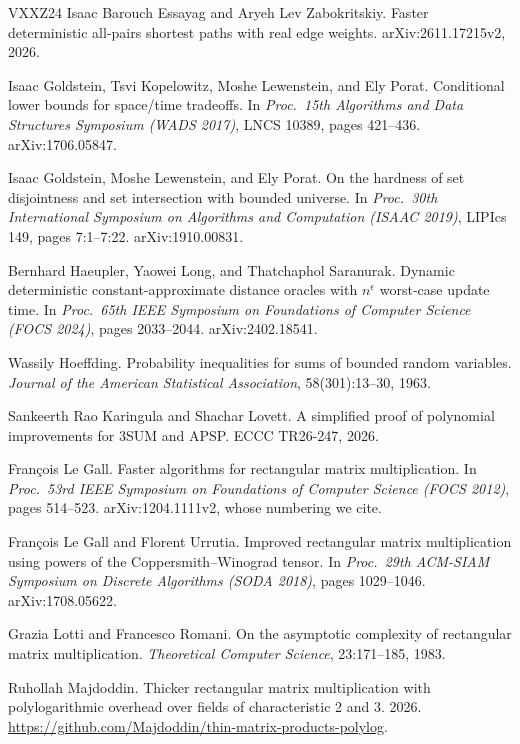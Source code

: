 \documentclass[11pt]{article}
\theoremstyle{definition}
\theoremstyle{remark}
\begin{document}
\begin{thebibliography}{VXXZ24}
 Isaac Barouch Essayag and Aryeh Lev Zabokritskiy. Faster deterministic all-pairs shortest paths with real edge weights. arXiv:2611.17215v2, 2026.

 Isaac Goldstein, Tsvi Kopelowitz, Moshe Lewenstein, and Ely Porat. Conditional lower bounds for space/time tradeoffs. In \emph{Proc.\ 15th Algorithms and Data Structures Symposium (WADS 2017)}, LNCS 10389, pages 421--436. arXiv:1706.05847.

 Isaac Goldstein, Moshe Lewenstein, and Ely Porat. On the hardness of set disjointness and set intersection with bounded universe. In \emph{Proc.\ 30th International Symposium on Algorithms and Computation (ISAAC 2019)}, LIPIcs 149, pages 7:1--7:22. arXiv:1910.00831.

 Bernhard Haeupler, Yaowei Long, and Thatchaphol Saranurak. Dynamic deterministic constant-approximate distance oracles with $n^{\epsilon}$ worst-case update time. In \emph{Proc.\ 65th IEEE Symposium on Foundations of Computer Science (FOCS 2024)}, pages 2033--2044. arXiv:2402.18541.

 Wassily Hoeffding. Probability inequalities for sums of bounded random variables. \emph{Journal of the American Statistical Association}, 58(301):13--30, 1963.

 Sankeerth Rao Karingula and Shachar Lovett. A simplified proof of polynomial improvements for 3SUM and APSP. ECCC TR26-247, 2026.

 Fran\c{c}ois Le Gall. Faster algorithms for rectangular matrix multiplication. In \emph{Proc.\ 53rd IEEE Symposium on Foundations of Computer Science (FOCS 2012)}, pages 514--523. arXiv:1204.1111v2, whose numbering we cite.

 Fran\c{c}ois Le Gall and Florent Urrutia. Improved rectangular matrix multiplication using powers of the Coppersmith--Winograd tensor. In \emph{Proc.\ 29th ACM-SIAM Symposium on Discrete Algorithms (SODA 2018)}, pages 1029--1046. arXiv:1708.05622.

 Grazia Lotti and Francesco Romani. On the asymptotic complexity of rectangular matrix multiplication. \emph{Theoretical Computer Science}, 23:171--185, 1983.

 Ruhollah Majdoddin. Thicker rectangular matrix multiplication with polylogarithmic overhead over fields of characteristic 2 and 3. 2026. \url{https://github.com/Majdoddin/thin-matrix-products-polylog}.


\end{thebibliography}
\end{document}
